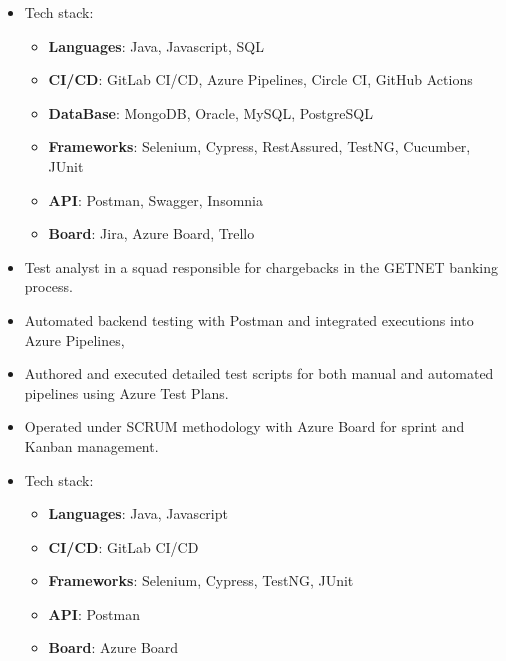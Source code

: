 {\begin{itemize}
\begin{itemize}
    \end{itemize}
    \item Tech stack:
    \begin{itemize}
        \item \textbf{Languages}: {\color{accent2}Java, Javascript, SQL}
        \item \textbf{CI/CD}: {\color{accent2}GitLab CI/CD, Azure Pipelines, Circle CI, GitHub Actions}
        \item \textbf{DataBase}: {\color{accent2}MongoDB, Oracle, MySQL, PostgreSQL}
        \item \textbf{Frameworks}: {\color{accent2}Selenium, Cypress, RestAssured, TestNG, Cucumber, JUnit}
        \item \textbf{API}: {\color{accent2}Postman, Swagger, Insomnia}
        \item \textbf{Board}: {\color{accent2}Jira, Azure Board, Trello}
    \end{itemize}
\end{itemize}

\begin{itemize}
    \item Test analyst in a squad responsible for chargebacks in the GETNET banking process.
    \item Automated backend testing with Postman and integrated executions into Azure Pipelines,
    \item Authored and executed detailed test scripts for both manual and automated pipelines using Azure Test Plans.
    \item Operated under SCRUM methodology with Azure Board for sprint and Kanban management.
    \item Tech stack:    
    \begin{itemize}
        \item \textbf{Languages}: {\color{accent2}Java, Javascript}
        \item \textbf{CI/CD}: {\color{accent2}GitLab CI/CD}
        \item \textbf{Frameworks}: {\color{accent2}Selenium, Cypress, TestNG, JUnit}
        \item \textbf{API}: {\color{accent2}Postman}
        \item \textbf{Board}: {\color{accent2}Azure Board}
    \end{itemize}
\end{itemize}

}
